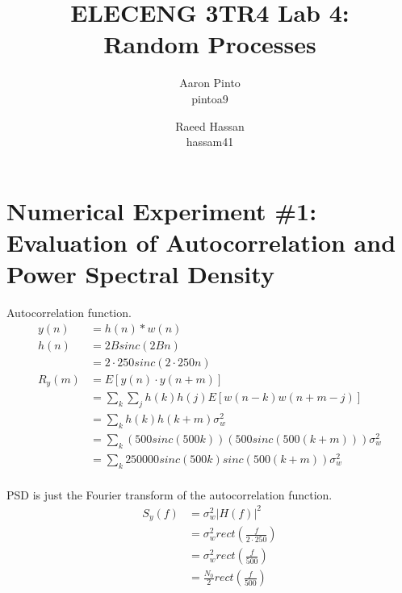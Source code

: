 \documentclass[12pt]{article}
\title{ELECENG 3TR4 Lab 4: \\ Random Processes}
\author{
    Aaron Pinto \\ pintoa9
    \and
    Raeed Hassan \\ hassam41
}
\begin{document}
\maketitle
\clearpage

\section*{Numerical Experiment \#1: Evaluation of Autocorrelation and Power Spectral Density}

Autocorrelation function.
\begin{equation*}
\begin{aligned}
        y(n) &= h(n)\ast w(n) \\
        h(n) &= 2Bsinc(2Bn) \\
        &= 2\cdot 250sinc(2\cdot 250 n) \\
	R_y(m) &= E\left[y(n)\cdot y(n+m)\right] \\
        &= \sum_k\sum_j h(k)h(j)E[w(n-k)w(n+m-j)] \\
	&= \sum_k h(k)h(k+m)\sigma_w^2 \\
        &= \sum_k (500sinc(500k))(500sinc(500(k+m)))\sigma_w^2 \\
        &= \sum_k 250000sinc(500k)sinc(500(k+m))\sigma_w^2 \\
\end{aligned}
\end{equation*}

PSD is just the Fourier transform of the autocorrelation function.
\begin{equation*}
\begin{aligned}
        S_y(f) &= \sigma_w^2 \left | H(f) \right |^2 \\
        &= \sigma_w^2 rect(\frac{f}{2\cdot 250}) \\
        &= \sigma_w^2 rect(\frac{f}{500}) \\
        &= \frac{N_0}{2} rect(\frac{f}{500}) \\
\end{aligned}
\end{equation*}
\end{document}
